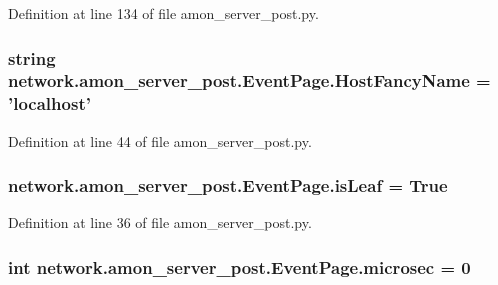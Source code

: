 Definition at line 134 of file amon\-\_\-server\-\_\-post.\-py.

\hypertarget{classnetwork_1_1amon__server__post_1_1_event_page_ab2d4c291eb38394dd80dc0da415bc8f7}{
\subsubsection[{Host\-Fancy\-Name}]{\setlength{\rightskip}{0pt plus 5cm}string network.\-amon\-\_\-server\-\_\-post.\-Event\-Page.\-Host\-Fancy\-Name = 'localhost'\hspace{0.3cm}{\ttfamily [static]}}}\label{classnetwork_1_1amon__server__post_1_1_event_page_ab2d4c291eb38394dd80dc0da415bc8f7}


Definition at line 44 of file amon\-\_\-server\-\_\-post.\-py.

\hypertarget{classnetwork_1_1amon__server__post_1_1_event_page_a2c4039685dcc225adc4c2a998ebdbc97}{
\subsubsection[{is\-Leaf}]{\setlength{\rightskip}{0pt plus 5cm}network.\-amon\-\_\-server\-\_\-post.\-Event\-Page.\-is\-Leaf = True\hspace{0.3cm}{\ttfamily [static]}}}\label{classnetwork_1_1amon__server__post_1_1_event_page_a2c4039685dcc225adc4c2a998ebdbc97}


Definition at line 36 of file amon\-\_\-server\-\_\-post.\-py.

\hypertarget{classnetwork_1_1amon__server__post_1_1_event_page_ac1ec0da9b3424978570e5327b65cbbcc}{
\subsubsection[{microsec}]{\setlength{\rightskip}{0pt plus 5cm}int network.\-amon\-\_\-server\-\_\-post.\-Event\-Page.\-microsec = 0\hspace{0.3cm}{\ttfamily [static]}}}\label{classnetwork_1_1amon__server__post_1_1_event_page_ac1ec0da9b3424978570e5327b65cbbcc}


